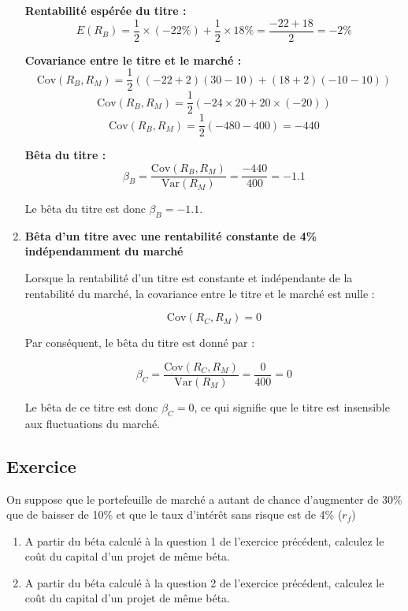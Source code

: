 \documentclass[a4paper, 12pt]{report}
\begin{document}
\begin{enumerate}
	\textbf{Rentabilité espérée du titre :}
	\[
	E(R_B) = \frac{1}{2} \times (-22\%) + \frac{1}{2} \times 18\% = \frac{-22 + 18}{2} = -2\%
	\]
	
	\textbf{Covariance entre le titre et le marché :}
	\[
	\text{Cov}(R_B, R_M) = \frac{1}{2} \left( (-22 + 2)(30 - 10) + (18 + 2)(-10 - 10) \right)
	\]
	\[
	\text{Cov}(R_B, R_M) = \frac{1}{2} \left( -24 \times 20 + 20 \times (-20) \right)
	\]
	\[
	\text{Cov}(R_B, R_M) = \frac{1}{2} (-480 - 400) = -440
	\]
	
	\textbf{Bêta du titre :}
	\[
	\beta_B = \frac{\text{Cov}(R_B, R_M)}{\text{Var}(R_M)} = \frac{-440}{400} = -1.1
	\]
	
	Le bêta du titre est donc \( \beta_B = -1.1 \).
	
	\item \textbf{Bêta d'un titre avec une rentabilité constante de 4\% indépendamment du marché}
	
	Lorsque la rentabilité d'un titre est constante et indépendante de la rentabilité du marché, la covariance entre le titre et le marché est nulle :
	
	\[
	\text{Cov}(R_C, R_M) = 0
	\]
	
	Par conséquent, le bêta du titre est donné par :
	
	\[
	\beta_C = \frac{\text{Cov}(R_C, R_M)}{\text{Var}(R_M)} = \frac{0}{400} = 0
	\]
	
	Le bêta de ce titre est donc \( \beta_C = 0 \), ce qui signifie que le titre est insensible aux fluctuations du marché.
	
\end{enumerate}

\subsection{Exercice}

On suppose que le portefeuille de marché a autant de chance d'augmenter de 30\% que de baisser de 10\% et que le taux d'intérêt sans risque est de 4\% (\( r_f \))

\begin{enumerate}
	\item A partir du béta calculé à  la question 1 de l'exercice précédent, calculez le coût du capital d'un projet de même béta.
	\item A partir du béta calculé à  la question 2 de l'exercice précédent, calculez le coût du capital d'un projet de même béta.
\end{enumerate}
\end{document}

